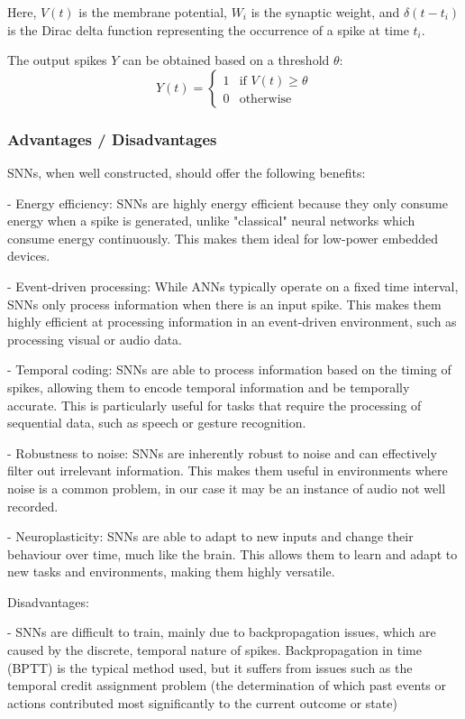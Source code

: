 \documentclass[11pt]{article}
\begin{document}
Here, \(V(t)\) is the membrane potential, \(W_i\) is the synaptic weight, and \(\delta(t - t_i)\) is the Dirac delta function representing the occurrence of a spike at time \(t_i\).

The output spikes \(Y\) can be obtained based on a threshold \( \theta \):
$$
  Y(t) =
  \begin{cases}
    1 & \text{if } V(t) \geq \theta \\
    0 & \text{otherwise}
  \end{cases}
$$



\subsubsection{Advantages / Disadvantages}


SNNs, when well constructed, should offer the following benefits:

- Energy efficiency: SNNs are highly energy efficient because they only consume energy when a spike is generated, unlike "classical" neural networks which consume energy continuously. This makes them ideal for low-power embedded devices.

- Event-driven processing: While ANNs typically operate on a fixed time interval, SNNs only process information when there is an input spike. This makes them highly efficient at processing information in an event-driven environment, such as processing visual or audio data.

- Temporal coding: SNNs are able to process information based on the timing of spikes, allowing them to encode temporal information and be temporally accurate. This is particularly useful for tasks that require the processing of sequential data, such as speech or gesture recognition.

- Robustness to noise: SNNs are inherently robust to noise and can effectively filter out irrelevant information. This makes them useful in environments where noise is a common problem, in our case it may be an instance of audio not well recorded.

- Neuroplasticity: SNNs are able to adapt to new inputs and change their behaviour over time, much like the brain. This allows them to learn and adapt to new tasks and environments, making them highly versatile.


Disadvantages:

- SNNs are difficult to train, mainly due to backpropagation issues, which are caused by the discrete, temporal nature of spikes. Backpropagation in time (BPTT) is the typical method used, but it suffers from issues such as the temporal credit assignment problem (the determination of which past events or actions contributed most significantly to the current outcome or state)
\end{document}
